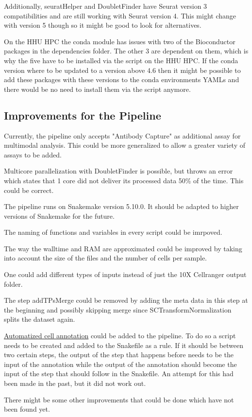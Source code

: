 Additionally, seuratHelper and DoubletFinder have Seurat version 3 compatibilities and are still working with Seurat version 4. This might change with version 5 though so it might be good to look for alternatives.

On the HHU HPC the conda module has issues with two of the Bioconductor packages in the dependencies folder. The other 3 are dependent on them, which is why the five have to be installed via the script on the HHU HPC. If the conda version where to be updated to a version above 4.6 then it might be possible to add these packages with these versions to the conda environments YAMLs and there would be no need to install them via the script anymore.

\subsection{Improvements for the Pipeline}
Currently, the pipeline only accepts "Antibody Capture" as additional assay for multimodal analysis. This could be more generalized to allow a greater variety of assays to be added.

Multicore parallelization with DoubletFinder is possible, but throws an error which states that 1 core did not deliver its processed data 50\% of the time. This could be correct.

The pipeline runs on Snakemake version 5.10.0. It should be adapted to higher versions of Snakemake for the future.

The naming of functions and variables in every script could be imrpoved.

The way the walltime and RAM are approximated could be improved by taking into account the size of the files and the number of cells per sample.

One could add different types of inputs instead of just the 10X Cellranger output folder.

The step addTPsMerge could be removed by adding the meta data in this step at the beginning and possibly skipping merge since SCTransformNormalization splits the dataset again.

\underline{Automatized cell annotation} could be added to the pipeline. To do so a script needs to be created and added to the Snakefile as a rule. If it should be between two certain steps, the output of the step that happens before needs to be the input of the annotation while the output of the annotation should become the input of the step that should follow in the Snakefile. An attempt for this had been made in the past, but it did not work out.

There might be some other improvements that could be done which have not been found yet.